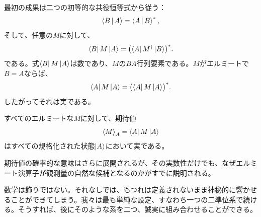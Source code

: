 最初の成果は二つの初等的な共役恒等式から従う：
\begin{equation}
  \left\langle B\,\middle|\,A\right\rangle=\left\langle A\,\middle|\,B\right\rangle^*,
  \label{eq:l03-inner-conjugation}
\end{equation}
そして、任意の\(M\)に対して、
\begin{equation}
  \left\langle B\right\rvert M\left\lvert A\right\rangle
  =
  \bigl(\left\langle A\right\rvert M^\dagger\left\lvert B\right\rangle\bigr)^*.
  \label{eq:l03-matrix-element-conjugation}
\end{equation}
である。式\(\left\langle B\right\rvert M\left\lvert A\right\rangle\)は数であり、\(M\)の\(BA\)行列要素である。\(M\)がエルミートで\(B=A\)ならば、
\begin{equation}
  \left\langle A\right\rvert M\left\lvert A\right\rangle
  =
  \bigl(\left\langle A\right\rvert M\left\lvert A\right\rangle\bigr)^*.
\end{equation}
したがってそれは実である。

\begin{proposition}
すべてのエルミートな\(M\)に対して、期待値
\begin{equation}
  \left\langle M\right\rangle_A=\left\langle A\right\rvert M\left\lvert A\right\rangle
  \label{eq:l03-expectation}
\end{equation}
はすべての規格化された状態\(\left\lvert A\right\rangle\)において実である。
\end{proposition}

期待値の確率的な意味はさらに展開されるが、その実数性だけでも、なぜエルミート演算子が観測量の自然な候補となるのかがすでに説明される。

\begin{classroomqa}
\end{classroomqa}

\begin{classroomqa}
\end{classroomqa}

数学は飾りではない。それなしでは、もつれは定義されないまま神秘的に響かせることができてしまう。我々は最も単純な設定、すなわち一つの二準位系で続ける。そうすれば、後にそのような系を二つ、誠実に組み合わせることができる。

